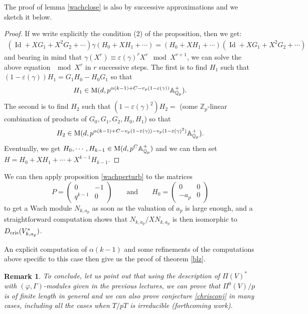 \documentclass[11pt]{amsart}
\def\Z{{\mathbb Z}_p}
\def\Q{{\mathbb Q}_p}
\def\eps{\varepsilon}
\def\aplus{\mathbb{A}^+}
\def\dcris{D_{\rm cris}}
\def\on{\operatorname}
\newtheorem{rem}[definit]{\bf{Remark}}
\begin{document}
The proof of lemma \ref{wachclose} is also by successive 
approximations and we sketch it below. 
\begin{proof} 
If we write explicitly the condition (2) of the proposition,  
then we get: 
\begin{multline*} 
(\on{Id} + X G_1 + X^2 G_2 + \cdots )\gamma(H_0 + X H_1 + \cdots)  
=  (H_0 + X H_1 + \cdots) (\on{Id} + X G_1 + X^2 G_2 + \cdots )  
\end{multline*} 
and bearing in mind that $\gamma(X^r) \equiv \eps(\gamma)^r X^r 
\mod{X^{r+1}}$, we can solve the above equation $\mod{X^r}$ in $r$ 
successive steps. The first is to find $H_1$ such that 
$(1-\eps(\gamma))H_1 = G_1 H_0 - H_0 G_1$ so that \[ H_1 \in {\rm M} 
(d, p^{\alpha(k-1)+C-v_p(1-\eps(\gamma))} \aplus_{\Q}). \]  
The second is 
to find $H_2$ such that $(1-\eps(\gamma)^2)H_2 =$ (some $\Z$-linear 
combination of products of $G_0, G_1, G_2, H_0, H_1$) so that  \[ H_2   
\in {\rm M} (d, p^{\alpha(k-1)+C-v_p(1-\eps(\gamma))  
- v_p(1-\eps(\gamma)^2)} \aplus_{\Q}). \] Eventually, we get 
$H_0,\cdots, H_{k-1} \in {\rm M} (d, p^C \aplus_{\Q})$  
and we can then set 
$H=H_0+XH_1+\cdots+X^{k-1}H_{k-1}$. 
\end{proof} 
 
We can then apply proposition \ref{wachperturb} to the matrices 
\[ P = \begin{pmatrix} 
0 & -1 \\ q^{k-1} & 0  
\end{pmatrix}  
\qquad\text{and}\qquad 
H_0 = \begin{pmatrix} 
0 & 0 \\ -a_p & 0  
\end{pmatrix} \] 
to get a Wach module $N_{k,a_p}$ as soon as the valuation of $a_p$ is 
large enough, and a straightforward computation shows that 
$N_{k,a_p}/X N_{k,a_p}$ is then isomorphic to $\dcris(V_{k,a_p}^*)$. 
 
An explicit computation of $\alpha(k-1)$ and some refinements of the 
computations above specific to this case then give us the 
proof of theorem \ref{blz}. 
 
\begin{rem} 
To conclude, let us point out that using the description of $\Pi(V)^*$ 
with $(\varphi,\Gamma)$-modules given in the previous lectures, 
we can prove that $\Pi^0(V)/p$ is of 
finite length in general and we can also prove conjecture 
\ref{chrisconj} in many cases, including all the cases when $T/pT$ is 
irreducible (forthcoming work).  
\end{rem} 
 
\end{document}
